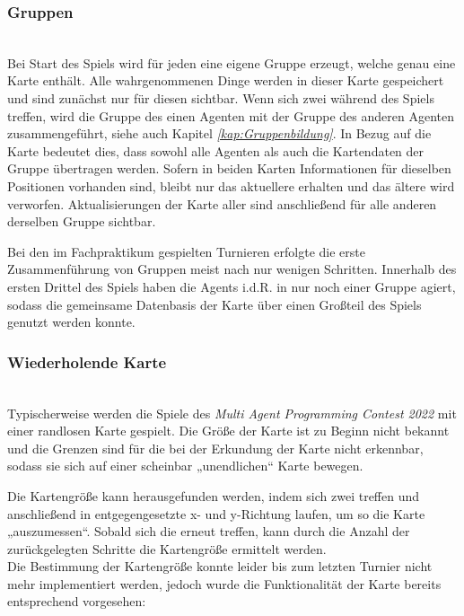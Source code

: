 \subsubsection{Gruppen} ~\\
Bei Start des Spiels wird für jeden \Agent eine eigene Gruppe erzeugt, welche genau eine Karte enthält. Alle wahrgenommenen Dinge werden in dieser Karte gespeichert und sind zunächst nur für diesen \Agent sichtbar. Wenn sich zwei \Agents während des Spiels treffen, wird die Gruppe des einen Agenten mit der Gruppe des anderen Agenten zusammengeführt, siehe auch Kapitel \textit{\ref{kap:Gruppenbildung}}. In Bezug auf die Karte bedeutet dies, dass sowohl alle Agenten als auch die Kartendaten der Gruppe übertragen werden. Sofern in beiden Karten Informationen für dieselben Positionen vorhanden sind, bleibt nur das aktuellere \NextMapTile erhalten und das ältere wird verworfen. Aktualisierungen der Karte aller \Agents sind anschließend für alle anderen \Agents derselben Gruppe sichtbar. \newline

Bei den im Fachpraktikum gespielten Turnieren erfolgte die erste Zusammenführung von Gruppen meist nach nur wenigen Schritten. Innerhalb des ersten Drittel des Spiels haben die Agents i.d.R. in nur noch einer Gruppe agiert, sodass die gemeinsame Datenbasis der Karte über einen Großteil des Spiels genutzt werden konnte. 

\subsubsection{Wiederholende Karte} ~\\
Typischerweise werden die Spiele des \textit{Multi Agent Programming Contest 2022} mit einer randlosen Karte gespielt. Die Größe der Karte ist zu Beginn nicht bekannt und die Grenzen sind für die \Agents bei der Erkundung der Karte nicht erkennbar, sodass sie sich auf einer scheinbar „unendlichen“ Karte bewegen.\newline

Die Kartengröße kann herausgefunden werden, indem sich zwei \Agents treffen und anschließend in entgegengesetzte x- und y-Richtung laufen, um so die Karte „auszumessen“. Sobald sich die \Agents erneut treffen, kann durch die Anzahl der zurückgelegten Schritte die Kartengröße ermittelt werden. \\ Die Bestimmung der Kartengröße konnte leider bis zum letzten Turnier nicht mehr implementiert werden, jedoch wurde die Funktionalität der Karte bereits entsprechend vorgesehen: \newline


